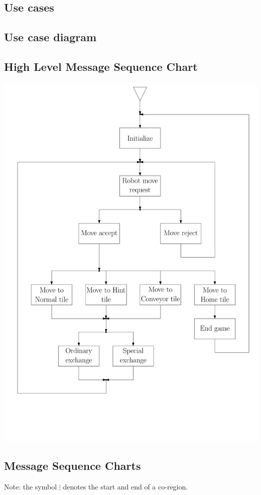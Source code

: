 \subsection{Use cases}
	
\subsection{Use case diagram}
	

\subsection{High Level Message Sequence Chart}
	\includegraphics[width=\linewidth,bb=0 0 680 1000]{MSC-files/HMSC.pdf}
	
\subsection{Message Sequence Charts}
	Note: the symbol $\vdots$ denotes the start and end of a co-region.

